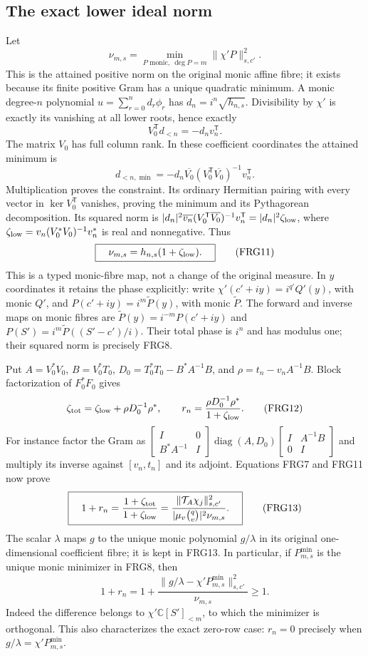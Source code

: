 \documentclass[11pt,a4paper]{article}
\begin{document}
\subsection{The exact lower ideal norm}
Let
\[
\nu_{m,s}=\min_{P\text{ monic},\ \deg P=m}
                     \|\chi'P\|_{s,c'}^2.
\tag{FRG8}
\]
This is the attained positive norm on the original monic affine fibre;
it exists because its finite positive Gram has a unique quadratic
minimum. A monic degree-$n$ polynomial $u=\sum_{r=0}^nd_r\phi_r$
has $d_n=i^n\sqrt{h_{n,s}}$. Divisibility by $\chi'$ is exactly its
vanishing at all lower roots, hence exactly
\[
V_0^{\mathsf T}d_{<n}=-d_nv_n^{\mathsf T}.
\tag{FRG9}
\]
The matrix $V_0$ has full column rank. In these coefficient coordinates
the attained minimum is
\[
d_{<n,\min}=-d_n\overline{V_0}
             (V_0^{\mathsf T}\overline{V_0})^{-1}v_n^{\mathsf T}.
\tag{FRG10}
\]
Multiplication proves the constraint. Its ordinary Hermitian pairing
with every vector in $\ker V_0^{\mathsf T}$ vanishes, proving the
minimum and its Pythagorean decomposition. Its squared norm is
$|d_n|^2\overline{v_n}(V_0^{\mathsf T}\overline{V_0})^{-1}
v_n^{\mathsf T}=|d_n|^2\zeta_{\rm low}$, where
$\zeta_{\rm low}=v_n(V_0^*V_0)^{-1}v_n^*$ is real and nonnegative.
Thus
\[
\boxed{\quad \nu_{m,s}=h_{n,s}(1+\zeta_{\rm low}).\quad}
\tag{FRG11}
\]
This is a typed monic-fibre map, not a change of the original measure.
In $y$ coordinates it retains the phase explicitly: write
$\chi'(c'+iy)=i^{q'}Q'(y)$, with monic $Q'$, and
$P(c'+iy)=i^m\widetilde P(y)$, with monic $\widetilde P$.
The forward and inverse maps on monic fibres are
$\widetilde P(y)=i^{-m}P(c'+iy)$ and
$P(S')=i^m\widetilde P((S'-c')/i)$. Their total phase is $i^n$
and has modulus one; their squared norm is precisely FRG8.

Put $A=V_0^*V_0$, $B=V_0^*T_0$,
$D_0=T_0^*T_0-B^*A^{-1}B$, and
$\rho=t_n-v_nA^{-1}B$. Block factorization of $F_0^*F_0$ gives
\[
\zeta_{\rm tot}=\zeta_{\rm low}+\rho D_0^{-1}\rho^*,\qquad
r_n=\frac{\rho D_0^{-1}\rho^*}{1+\zeta_{\rm low}}.
\tag{FRG12}
\]
For instance factor the Gram as
$\left[\begin{smallmatrix}I&0\\B^*A^{-1}&I\end{smallmatrix}\right]
\operatorname{diag}(A,D_0)
\left[\begin{smallmatrix}I&A^{-1}B\\0&I\end{smallmatrix}\right]$
and multiply its inverse against $[v_n,t_n]$ and its adjoint.
Equations FRG7 and FRG11 now prove
\[
\boxed{\quad
1+r_n=\frac{1+\zeta_{\rm tot}}{1+\zeta_{\rm low}}
 =\frac{\|\mathcal T_A\chi_j\|_{s,c'}^2}{|\mu_v\binom qv|^2\nu_{m,s}}.
\quad}\tag{FRG13}
\]
The scalar $\lambda$ maps $g$ to the unique monic polynomial $g/\lambda$
in its original one-dimensional coefficient fibre; it is kept in FRG13.
In particular, if $P_{m,s}^{\min}$ is the unique monic minimizer in
FRG8, then
\[
1+r_n=1+
\frac{\|g/\lambda-\chi'P_{m,s}^{\min}\|_{s,c'}^2}{\nu_{m,s}}\ge1.
\tag{FRG14}
\]
Indeed the difference belongs to $\chi'\mathbb C[S']_{<m}$, to which
the minimizer is orthogonal. This also characterizes the exact zero-row
case: $r_n=0$ precisely when $g/\lambda=\chi'P_{m,s}^{\min}$.
\end{document}
